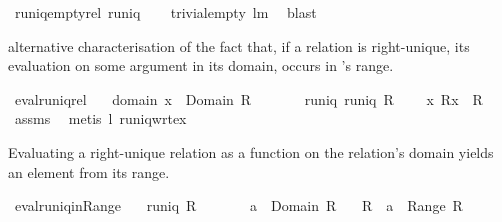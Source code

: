\begin{isabellebody}
\begin{isamarkuptext}
\end{isamarkuptext}%
\isamarkuptrue%
\isamarkupfalse%
\ runiq{\isacharunderscore}emptyrel{\isacharcolon}\ {\isachardoublequoteopen}runiq\ {\isacharbraceleft}{\isacharbraceright}{\isachardoublequoteclose}%
\isadelimproof
\ %
\endisadelimproof
%
\isatagproof
{}\isamarkupfalse%
\ trivial{\isacharunderscore}empty\ lm{}{}{}\ \isamarkupfalse%
\ blast%
\endisatagproof
{\isafoldproof}%
%
\isadelimproof
%
\endisadelimproof
%
\begin{isamarkuptext}%
alternative characterisation of the fact that, if a relation  is right-unique,
  its evaluation  on some argument  in its domain, occurs in 's
  range.%
\end{isamarkuptext}%
\isamarkuptrue%
\isamarkupfalse%
\ eval{\isacharunderscore}runiq{\isacharunderscore}rel{\isacharcolon}\isanewline
\ \ \ domain{\isacharcolon}\ {\isachardoublequoteopen}x\ {\isasymin}\ Domain\ R{\isachardoublequoteclose}\isanewline
\ \ \ \ \ \ \ runiq{\isacharcolon}\ {\isachardoublequoteopen}runiq\ R{\isachardoublequoteclose}\ \isanewline
\ \ \ {\isachardoublequoteopen}{\isacharparenleft}x{\isacharcomma}\ R{\isacharcomma}{\isacharcomma}x{\isacharparenright}\ {\isasymin}\ R{\isachardoublequoteclose}\isanewline
%
\isadelimproof
%
\endisadelimproof
%
\isatagproof
{}\isamarkupfalse%
\ assms\ \isamarkupfalse%
\ {\isacharparenleft}metis\ l{}{}\ runiq{\isacharunderscore}wrt{\isacharunderscore}ex{}{\isacharparenright}%
\endisatagproof
{\isafoldproof}%
%
\isadelimproof
%
\endisadelimproof
%
\begin{isamarkuptext}%
Evaluating a right-unique relation as a function on the relation's domain yields an
  element from its range.%
\end{isamarkuptext}%
\isamarkuptrue%
\isamarkupfalse%
\ eval{\isacharunderscore}runiq{\isacharunderscore}in{\isacharunderscore}Range{\isacharcolon}\isanewline
\ \ \ {\isachardoublequoteopen}runiq\ R{\isachardoublequoteclose}\isanewline
\ \ \ \ \ \ \ {\isachardoublequoteopen}a\ {\isasymin}\ Domain\ R{\isachardoublequoteclose}\isanewline
\ \ \ {\isachardoublequoteopen}R\ {\isacharcomma}{\isacharcomma}\ a\ {\isasymin}\ Range\ R{\isachardoublequoteclose}\isanewline
%
\isadelimproof
%
\endisadelimproof

\end{isabellebody}
